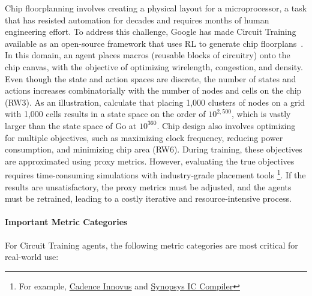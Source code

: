 Chip floorplanning involves creating a physical layout for a microprocessor, a task that has resisted automation for decades and requires months of human engineering effort. To address this challenge, Google has made Circuit Training available as an open-source framework that uses RL to generate chip floorplans~\citep{CircuitTraining2021}.
In this domain, an agent places macros (reusable blocks of circuitry) onto the chip canvas, with the objective of optimizing wirelength, congestion, and density.
Even though the state and action spaces are discrete, the number of states and actions increases combinatorially with the number of nodes and cells on the chip (RW3).
As an illustration, \citet{mirhoseini2021graph} calculate that placing 1,000 clusters of nodes on a grid with 1,000 cells results in a state space on the order of $10^{2,500}$, which is vastly larger than the state space of Go at $10^{360}$.
Chip design also involves optimizing for multiple objectives, such as maximizing clock frequency, reducing power consumption, and minimizing chip area (RW6). During training, these objectives are approximated using proxy metrics.
However, evaluating the true objectives requires time-consuming simulations with industry-grade placement tools \footnote{For example, \href{https://www.cadence.com/en_US/home/tools/digital-design-and-signoff/soc-implementation-and-floorplanning/innovus-implementation-system.html}{Cadence Innovus} and \href{https://www.synopsys.com/implementation-and-signoff/physical-implementation/ic-compiler.html}{Synopsys IC Compiler}}.
If the results are unsatisfactory, the proxy metrics must be adjusted, and the agents must be retrained, leading to a costly iterative and resource-intensive process.


\paragraph{Important Metric Categories}
For Circuit Training agents, the following metric categories are most critical for real-world use:

